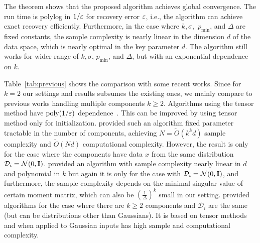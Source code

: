 The theorem shows that the proposed algorithm achieves global convergence. The run time is polylog in $1/\varepsilon$ for recovery error $\varepsilon$, i.e., the algorithm can achieve exact recovery efficiently. Furthermore, in the case where $k, \sigma,$ $p_{\min}$, and $\Delta$ are fixed constants, the sample complexity is nearly linear in the dimension $d$ of the data space, which is nearly optimal in the key parameter $d$. 
The algorithm still works for wider range of $k, \sigma$, $p_{\min}$, and $\Delta$, but with an exponential dependence on $k$. 
%


Table~\ref{tab:previous} shows the comparison with some recent works.
Since for $k=2$ our settings and results subsumes the existing ones, we mainly compare to previous works handling multiple components $k \ge 2$. Algorithms using the tensor method have $\text{poly}(1/\varepsilon)$ dependence~\citep{chaganty2013spectral,yi2014alternating,sedghi2016provable}.
This can be improved by using tensor method only for initialization. 
\citep{zhong2016mixed} provided such an algorithm fixed parameter tractable in the number of components, achieving $N = \tilde{O}(k^k d)$ sample complexity and $\tilde{O}(Nd)$ computational complexity. However, the result is only for the case where the components have data $x$ from the same distribution $\mathcal{D}_i = \mathcal{N}(0, \bold{I})$. \citep{yi2016solving} provided an algorithm with sample complexity nearly linear in $d$ and polynomial in $k$ but again it is only for the case with $\mathcal{D}_i = \mathcal{N}(0, \bold{I})$, and furthermore, the sample complexity depends on the minimal singular value of certain moment matrix, which can also be  $\left( \frac{1}{\Delta} \right)^{k}$ small in our setting.  
\citep{sedghi2016provable} provided algorithms for the case where there are $k\geq 2$ components and $\mathcal{D}_i$ are the same (but can be distributions other than Gaussians). It is based on tensor methods and when applied to Gaussian inputs has high sample and computational complexity. 

